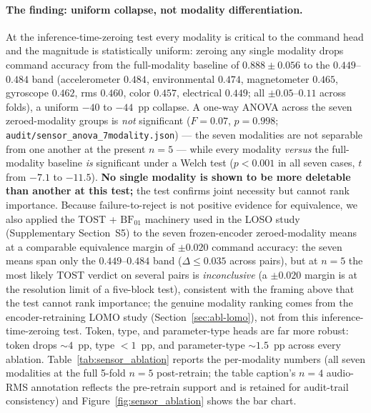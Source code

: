 \documentclass[sensors,article,submit,moreauthors,pdftex]{Definitions/mdpi}
\begin{document}
\paragraph{The finding: uniform collapse, not modality differentiation.} At the inference-time-zeroing test every modality is critical to the command head and the magnitude is statistically uniform: zeroing any single modality drops command accuracy from the full-modality baseline of $0.888 \pm 0.056$ to the $0.449$--$0.484$ band (accelerometer $0.484$, environmental $0.474$, magnetometer $0.465$, gyroscope $0.462$, rms $0.460$, color $0.457$, electrical $0.449$; all $\pm 0.05$--$0.11$ across folds), a uniform $-40$ to $-44$~pp collapse. A one-way ANOVA across the seven zeroed-modality groups is \emph{not} significant ($F=0.07$, $p=0.998$; \texttt{audit/sensor\_anova\_7modality.json}) --- the seven modalities are not separable from one another at the present $n\!=\!5$ --- while every modality \emph{versus} the full-modality baseline \emph{is} significant under a Welch test ($p<0.001$ in all seven cases, $t$ from $-7.1$ to $-11.5$). \textbf{No single modality is shown to be more deletable than another at this test;} the test confirms joint necessity but cannot rank importance. Because failure-to-reject is not positive evidence for equivalence, we also applied the TOST + $\mathrm{BF}_{01}$ machinery used in the LOSO study (Supplementary Section~S5) to the seven frozen-encoder zeroed-modality means at a comparable equivalence margin of $\pm 0.020$ command accuracy: the seven means span only the $0.449$--$0.484$ band ($\Delta\!\le\!0.035$ across pairs), but at $n\!=\!5$ the most likely TOST verdict on several pairs is \emph{inconclusive} (a $\pm 0.020$ margin is at the resolution limit of a five-block test), consistent with the framing above that the test cannot rank importance; the genuine modality ranking comes from the encoder-retraining LOMO study (Section~\ref{sec:abl-lomo}), not from this inference-time-zeroing test. Token, type, and parameter-type heads are far more robust: token drops $\sim 4$~pp, type $<1$~pp, and parameter-type $\sim 1.5$~pp across every ablation. Table~\ref{tab:sensor_ablation} reports the per-modality numbers (all seven modalities at the full 5-fold $n\!=\!5$ post-retrain; the table caption's $n\!=\!4$ audio-RMS annotation reflects the pre-retrain support and is retained for audit-trail consistency) and Figure~\ref{fig:sensor_ablation} shows the bar chart.


\end{document}
